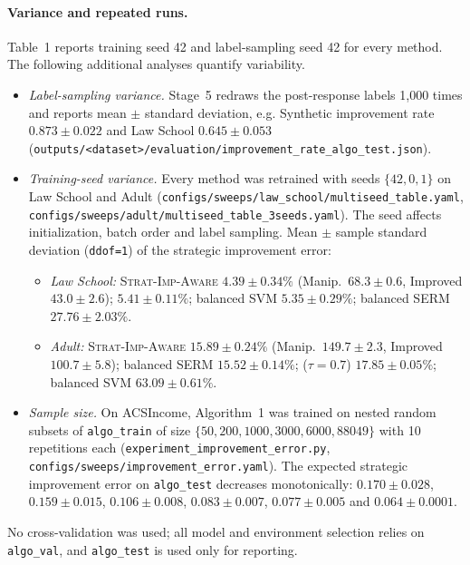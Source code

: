 \paragraph{Variance and repeated runs.}
Table~1 reports training seed 42 and label-sampling seed 42 for every method.
The following additional analyses quantify variability.
\begin{itemize}
  \item \emph{Label-sampling variance.} Stage~5 redraws the post-response
        labels 1{,}000 times and reports mean $\pm$ standard deviation, e.g.
        Synthetic improvement rate $0.873\pm0.022$ and Law School $0.645\pm0.053$
        (\texttt{outputs/<dataset>/evaluation/improvement\_rate\_algo\_test.json}).
  \item \emph{Training-seed variance.} Every method was retrained with seeds
        $\{42,0,1\}$ on Law School and Adult
        (\texttt{configs/sweeps/law\_school/multiseed\_table.yaml},
        \texttt{configs/sweeps/adult/multiseed\_table\_3seeds.yaml}). The seed
        affects initialization, batch order and label sampling. Mean $\pm$ sample
        standard deviation (\texttt{ddof=1}) of the strategic improvement error:
    \begin{itemize}
      \item \emph{Law School:} \textsc{Strat-Imp-Aware} $4.39\pm0.34\%$
            (Manip.\ $68.3\pm0.6$, Improved $43.0\pm2.6$);
            \citet{attias2025pac} $5.41\pm0.11\%$; balanced SVM $5.35\pm0.29\%$;
            balanced \textsc{SERM} $27.76\pm2.03\%$.
      \item \emph{Adult:} \textsc{Strat-Imp-Aware} $15.89\pm0.24\%$
            (Manip.\ $149.7\pm2.3$, Improved $100.7\pm5.8$); balanced
            \textsc{SERM} $15.52\pm0.14\%$; \citet{attias2025pac}
            ($\tau=0.7$) $17.85\pm0.05\%$; balanced SVM $63.09\pm0.61\%$.
    \end{itemize}
  \item \emph{Sample size.} On ACSIncome, Algorithm~1 was trained on nested
        random subsets of \texttt{algo\_train} of size
        $\{50,200,1000,3000,6000,88049\}$ with 10 repetitions each
        (\texttt{experiment\_improvement\_error.py},
        \texttt{configs/sweeps/improvement\_error.yaml}). The expected strategic
        improvement error on \texttt{algo\_test} decreases monotonically:
        $0.170\pm0.028$, $0.159\pm0.015$, $0.106\pm0.008$, $0.083\pm0.007$,
        $0.077\pm0.005$ and $0.064\pm0.0001$.
\end{itemize}
No cross-validation was used; all model and environment selection relies on
\texttt{algo\_val}, and \texttt{algo\_test} is used only for reporting.

